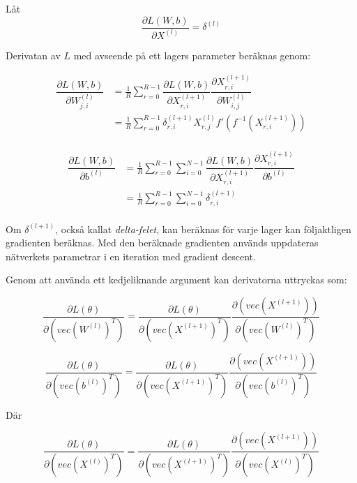 \documentclass[a4paper,11pt,twoside]{article}
\newcommand*{\pd}[2]{\ensuremath{\dfrac{\partial #1}{\partial #2}}}
\newcommand*{\inpd}[2]{\ensuremath{\frac{\partial #1}{\partial #2}}}
\begin{document}
Låt
\begin{equation}
\inpd{L(W,b)}{X^{(l)}} = \delta^{(l)}
\end{equation}

Derivatan av $L$ med avseende på ett lagers parameter beräknas genom:

\begin{equation}
\begin{split}
\pd{L(W,b)}{W^{(l)}_{j,i}} 
	& = \frac{1}{R}\sum^{R-1}_{r=0} \pd{L(W,b)}{X^{(l+1)}_{r,i}} \pd{X^{(l+1)}_{r,i}}{W^{(l)}_{i,j}} \\
	& = \frac{1}{R}\sum^{R-1}_{r=0} \delta^{(l+1)}_{r,i} X^{(l)}_{r,j} f'(f^{-1}(X^{(l+1)}_{r,i}))\\
\end{split}
\end{equation}

\begin{equation}
\begin{split}
\pd{L(W,b)}{b^{(l)}} 
	& = \frac{1}{R}\sum^{R-1}_{r=0} \sum^{N-1}_{i=0} \pd{L(W,b)}{X^{(l+1)}_{r,i}} \pd{X^{(l+1)}_{r,i}}{b^{(l)}} \\
	& = \frac{1}{R}\sum^{R-1}_{r=0} \sum^{N-1}_{i=0} \delta^{(l+1)}_{r,i} \\
\end{split}
\end{equation}

Om $\delta^{(l+1)}$, också kallat \textit{delta-felet}, kan beräknas för varje lager kan följaktligen gradienten beräknas. Med den beräknade gradienten används uppdateras nätverkets parametrar i en iteration med gradient descent.

Genom att använda ett kedjeliknande argument kan derivatorna uttryckas som: \cite{cs231n} \cite{convmath}

\begin{equation}
\pd{L(\theta)}{(vec(W^{(l)})^T)} = \pd{L(\theta)}{(vec(X^{(l+1)})^T)} \pd{(vec(X^{(l+1)}))}{(vec(W^{(l)})^T)}
\end{equation}

\begin{equation}
\pd{L(\theta)}{(vec(b^{(l)})^T)} = \pd{L(\theta)}{(vec(X^{(l+1)})^T)} \pd{(vec(X^{(l+1)}))}{(vec(b^{(l)})^T)}
\end{equation}

Där

\begin{equation}
\pd{L(\theta)}{(vec(X^{(l)})^T)} = \pd{L(\theta)}{(vec(X^{(l+1)})^T)} \pd{(vec(X^{(l+1)}))}{(vec(X^{(l)})^T)}
\end{equation}
\end{document}
